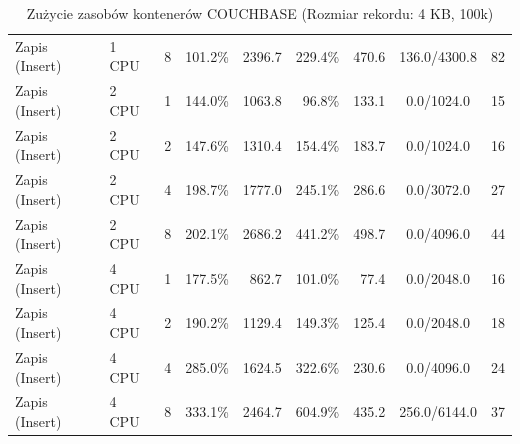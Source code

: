 \begin{table}[ht]
{\begin{tabular}{llcrrrrcc}
Zapis (Insert) & 1 CPU & 8 & 101.2\% & 2396.7 & 229.4\% & 470.6 & 136.0/4300.8 & 82 \\
Zapis (Insert) & 2 CPU & 1 & 144.0\% & 1063.8 & 96.8\% & 133.1 & 0.0/1024.0 & 15 \\
Zapis (Insert) & 2 CPU & 2 & 147.6\% & 1310.4 & 154.4\% & 183.7 & 0.0/1024.0 & 16 \\
Zapis (Insert) & 2 CPU & 4 & 198.7\% & 1777.0 & 245.1\% & 286.6 & 0.0/3072.0 & 27 \\
Zapis (Insert) & 2 CPU & 8 & 202.1\% & 2686.2 & 441.2\% & 498.7 & 0.0/4096.0 & 44 \\
Zapis (Insert) & 4 CPU & 1 & 177.5\% & 862.7 & 101.0\% & 77.4 & 0.0/2048.0 & 16 \\
Zapis (Insert) & 4 CPU & 2 & 190.2\% & 1129.4 & 149.3\% & 125.4 & 0.0/2048.0 & 18 \\
Zapis (Insert) & 4 CPU & 4 & 285.0\% & 1624.5 & 322.6\% & 230.6 & 0.0/4096.0 & 24 \\
Zapis (Insert) & 4 CPU & 8 & 333.1\% & 2464.7 & 604.9\% & 435.2 & 256.0/6144.0 & 37 \\
\bottomrule
\end{tabular}%
}
\caption{Zużycie zasobów kontenerów COUCHBASE (Rozmiar rekordu: 4 KB, 100k)}
\label{tab:resources_couchbase_medium_100000}
\end{table}
